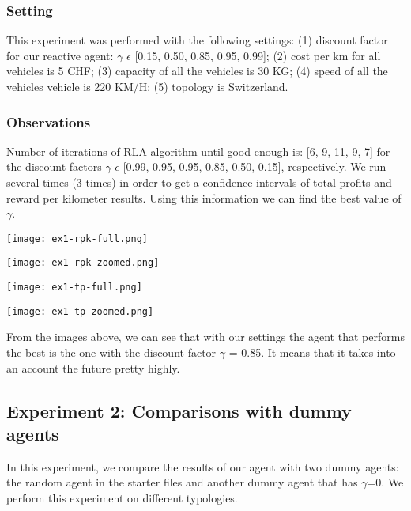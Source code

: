 \documentclass[11pt]{article}
\begin{document}
\subsubsection{Setting}
This experiment was performed with the following settings:
(1) discount factor for our reactive agent: $\gamma$ $\epsilon$ [0.15, 0.50, 0.85, 0.95, 0.99]; (2) cost per km for all vehicles is 5 CHF; (3) capacity of all the vehicles is 30 KG; (4) speed of all the vehicles vehicle is 220 KM/H; (5) topology is Switzerland.


\subsubsection{Observations}
Number of iterations of RLA algorithm until good enough is: [6, 9, 11, 9, 7] for the discount factors $\gamma$ $\epsilon$ [0.99, 0.95, 0.95, 0.85, 0.50, 0.15], respectively. We run several times (3 times) in order to get a confidence intervals of total profits and reward per kilometer results. Using this information we can find the best value of $\gamma$. 


\begin{multicols}{2}
\texttt{[image: ex1-rpk-full.png]}

\texttt{[image: ex1-rpk-zoomed.png]}
\end{multicols}

\begin{multicols}{2}
\texttt{[image: ex1-tp-full.png]}

\texttt{[image: ex1-tp-zoomed.png]}
\end{multicols}

From the images above, we can see that with our settings the agent that performs the best is the one with the discount factor $\gamma$ = 0.85. It means that it takes into an account the future pretty highly.

\subsection{Experiment 2: Comparisons with dummy agents}
In this experiment, we compare the results of our agent with two dummy agents: the random agent in the starter files and another dummy agent that has $\gamma$=0. We perform this experiment on different typologies.
\end{document}
